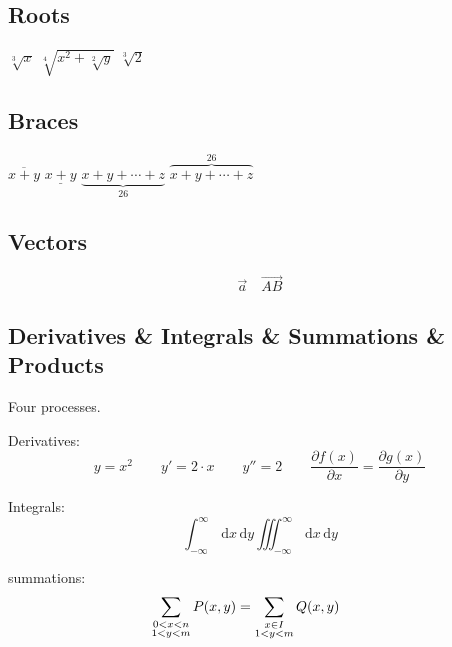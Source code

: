 \documentclass[12pt, oneside]{article}
\begin{document}
\subsection{Roots}
$\sqrt[3]{x}$ \qquad
$\sqrt[4]{x^{2}+\sqrt[2]{y}}$ \qquad 
$\sqrt[3]{2}$



\subsection{Braces}
$\overline{x + y}$ \qquad
$\underline{x + y}$ \qquad
$\underbrace{x + y + \cdots + z}_{26}$ \qquad
$\overbrace{x + y + \cdots + z}^{26}$



\subsection{Vectors}
\begin{displaymath}
\vec{a} \quad \overrightarrow{AB}
\end{displaymath}



\subsection{Derivatives \& Integrals \& Summations \& Products }
\newcommand{\ud}{\textrm{d}} %
Four processes.

Derivatives:
\begin{displaymath}
y = x^{2} \qquad y' = 2 \cdot x \qquad y'' = 2 \qquad %
\frac{\partial f(x)}{\partial x} = \frac{\partial g(x)}{\partial y}
\end{displaymath}

Integrals:
\begin{displaymath}
\int_{-\infty}^{\infty} \, \ud x \, \ud y 
\iiint_{-\infty}^{\infty} \, \ud x \, \ud y
\end{displaymath}

summations:
\begin{displaymath}
\sum_{\substack{0<x<n \\ 1<y<m}} P(x,y) =
\sum_{\begin{subarray}{c} x \in I \\ 1<y<m \end{subarray}} Q(x,y) \qquad
\end{displaymath}
\end{document}

